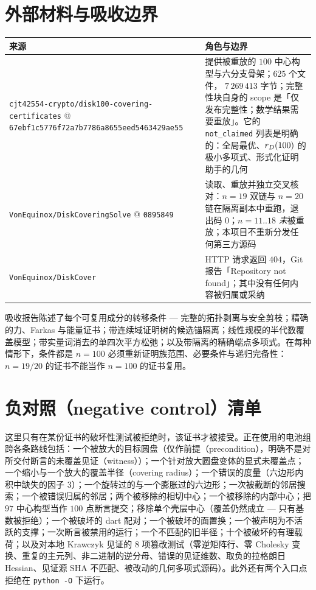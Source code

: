 \section{外部材料与吸收边界}

\begin{center}
\footnotesize
\begin{tabular}{@{}>{\raggedright\arraybackslash}p{}>{\raggedright\arraybackslash}p{}@{}}
\toprule
来源 & 角色与边界 \\
\midrule
\texttt{cjt42554-\allowbreak{}crypto/\allowbreak{}disk100-\allowbreak{}covering-\allowbreak{}certificates}
@ \texttt{67ebf1c5776f72a7b7786a8655eed5463429ae55} &
提供被重放的 $100$ 中心构型与六分支骨架；$625$ 个文件，
$7\,269\,413$ 字节；完整性块自身的 scope 是「仅发布完整性；数学结果需要重放」。它的 \texttt{not\_\allowbreak{}claimed} 列表是明确的：全局最优、$r_{D}(100)$ 的极小多项式、形式化证明助手的几何 \\
\texttt{VonEquinox/\allowbreak{}DiskCoveringSolve} @ \texttt{0895849} &
读取、重放并独立交叉核对：$n=19$ 双链与 $n=20$ 链在隔离副本中重跑，退出码 $0$；$n=11..18$ \emph{未}被重放；本项目不重新分发任何第三方源码 \\
\texttt{VonEquinox/\allowbreak{}DiskCover} & HTTP 请求返回 $404$，Git 报告「Repository not found」；其中没有任何内容被归属或采纳 \\
\bottomrule
\end{tabular}
\end{center}

吸收报告陈述了每个可复用成分的转移条件 --- 完整的拓扑剥离与安全剪枝；精确的力、Farkas 与能量证书；带连续域证明树的候选锚隔离；线性规模的半代数覆盖模型；带实量词消去的单四次平方松弛；以及带隔离的精确端点多项式。在每种情形下，条件都是 $n=100$ 必须重新证明族范围、必要条件与递归完备性：$n=19/20$ 的证书不能当作 $n=100$ 的证书复用。

\section{负对照（negative control）清单}

这里只有在某份证书的破坏性测试被拒绝时，该证书才被接受。正在使用的电池组跨各条路线包括：一个被放大的目标圆盘（仅作前提（precondition），明确不是对所交付断言的未覆盖见证（witness））；一个针对放大圆盘变体的显式未覆盖点；一个缩小与一个放大的覆盖半径（covering radius）；一个错误的度量（六边形内积中缺失的因子 $3$）；一个旋转过的与一个膨胀过的六边形；一次被截断的邻居搜索；一个被错误归属的邻居；两个被移除的相切中心；一个被移除的内部中心；把 $97$ 中心构型当作 $100$ 点断言提交；移除单个壳层中心（覆盖仍然成立 --- 只有基数被拒绝）；一个被破坏的 dart 配对；一个被破坏的面置换；一个被声明为不活跃的支撑；一次断言被禁用的运行；一个不匹配的旧半径；十个被破坏的有理载荷；以及对本地 Krawczyk 见证的 $8$ 项篡改测试（零逆矩阵行、零 Cholesky 变换、重复的主元列、非二进制的逆分母、错误的见证维数、取负的拉格朗日 Hessian、见证源 SHA 不匹配、被改动的几何多项式源码）。此外还有两个入口点拒绝在 \texttt{python -\allowbreak{}O} 下运行。

